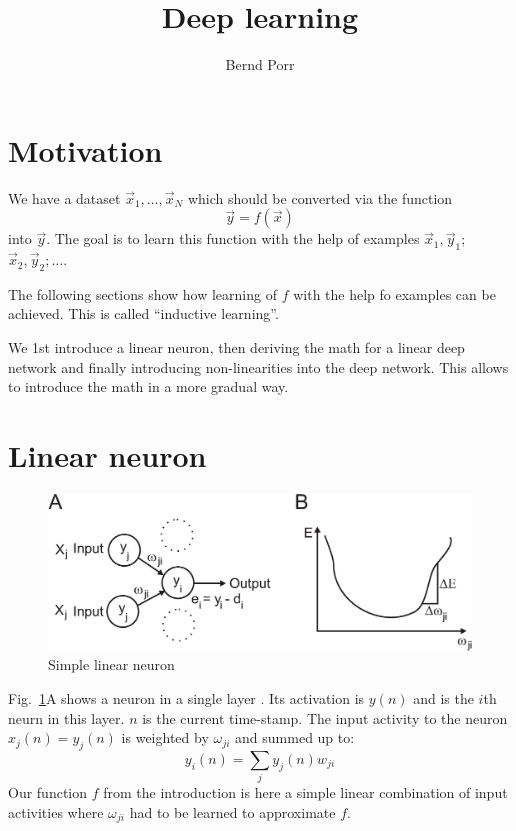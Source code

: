 \documentclass[12pt]{article}
\author{Bernd Porr}
\title{Deep learning}
\begin{document}
\maketitle

\section{Motivation}
We have a dataset $\vec{x}_1, \ldots, \vec{x}_N$ which should be converted
via the function
\begin{equation}
  \vec{y}=f(\vec{x}) \label{inductive}
\end{equation}
into $\vec{y}$. The goal is to learn this function with the help of
examples $\vec{x}_1,\vec{y}_1$; $\vec{x}_2,\vec{y}_2; \ldots$.

The following sections show how learning of $f$ with the help
fo examples can be achieved. This is called ``inductive learning''.

We 1st introduce a linear neuron, then deriving the math for a linear deep
network and finally introducing non-linearities into the deep network.
This allows to introduce the math in a more gradual way.

\section{Linear neuron}

\begin{figure}[!hbt]
\begin{center}
\mbox{\includegraphics[width=\textwidth]{one_layer}}
\end{center}
\caption{Simple linear neuron
\label{one_layer}}
\end{figure}

Fig.~\ref{one_layer}A shows a neuron in a single layer \citep{Rosenblatt58}.
Its activation is $y(n)$ and is the $i$th neurn in this layer.
$n$ is the current time-stamp. The input activity to the neuron $x_j(n) =
y_j(n)$ is weighted by $\omega_{ji}$ and summed up to:
\begin{equation}
  y_i(n) = \sum_j y_j(n) w_{ji} \label{linear_sum}
\end{equation}
Our function $f$ from the introduction is here a simple linear
combination of input activities where $\omega_{ji}$ had to be learned
to approximate $f$.
\end{document}
